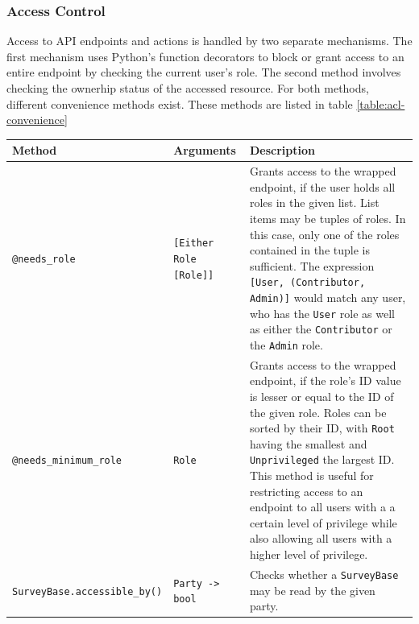 \documentclass[a4paper,11pt]{article}
\def\inline{\lstinline[basicstyle=\ttfamily,keywordstyle={}]}
\begin{document}
            \subsubsection{Access Control}
                Access to API endpoints and actions is handled by two separate mechanisms.
                The first mechanism uses Python's function decorators to
                block or grant access to an entire endpoint by checking the
                current user's role. The second method involves checking the
                ownerhip status of the accessed resource. For both methods,
                different convenience methods exist. These methods are listed in table 
                \ref{table:acl-convenience}

                \begin{table}
                    \begin{tabularx}{\textwidth}{|l|l|X|}
                        \hline
                        Method & Arguments & Description \\
                        \hline \hline
                        \inline{@needs_role} & \inline{[Either Role [Role]]} & 
                        Grants access to the wrapped endpoint, if the user holds all roles in the given 
                        list. List items may be tuples of roles. In this case, only one of the 
                        roles contained in the tuple is sufficient. The expression 
                        \inline{[User, (Contributor, Admin)]} would match any user, who
                        has the \inline{User} role as well as either the \inline{Contributor} or
                        the \inline{Admin} role.\\
                        \inline{@needs_minimum_role} & \inline{Role} &
                        Grants access to the wrapped endpoint, if the role's ID value is
                        lesser or equal to the ID of the given role. Roles
                        can be sorted by their ID, with \inline{Root} having the smallest and
                        \inline{Unprivileged} the largest ID. This method is useful for
                        restricting access to an endpoint to all users with a
                        a certain level of privilege while also allowing all users
                        with a higher level of privilege. \\
                        \hline
                        \inline{SurveyBase.accessible_by()} & \inline{Party -> bool} & 
                        Checks whether a \inline{SurveyBase} may be read by the given party.

\end{tabularx}
\end{table}
\end{document}
